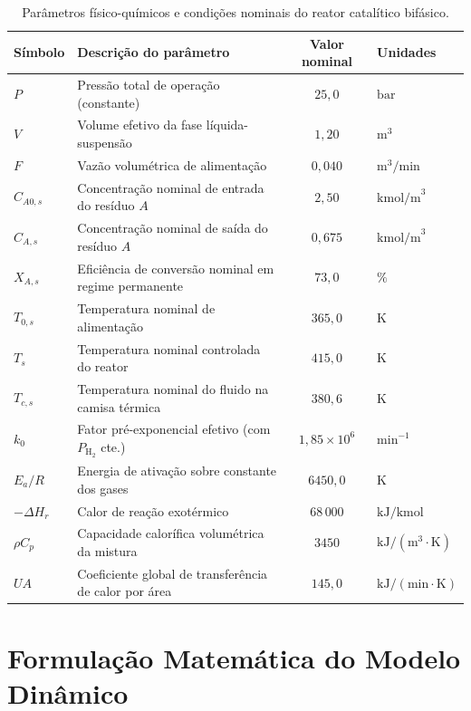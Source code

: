 \documentclass[11pt, a4paper]{article}
\begin{document}
\begin{table}[h]
\centering
\caption{Parâmetros físico-químicos e condições nominais do reator catalítico bifásico.}
\vspace{4pt}
\begin{tabular}{@{}llcl@{}}
\toprule
\textbf{Símbolo} & \textbf{Descrição do parâmetro} & \textbf{Valor nominal} & \textbf{Unidades} \\
\midrule
$P$ & Pressão total de operação (constante) & $25{,}0$ & $\text{bar}$ \\
$V$ & Volume efetivo da fase líquida-suspensão & $1{,}20$ & $\text{m}^3$ \\
$F$ & Vazão volumétrica de alimentação & $0{,}040$ & $\text{m}^3/\text{min}$ \\
$C_{A0,s}$ & Concentração nominal de entrada do resíduo $A$ & $2{,}50$ & $\text{kmol/m}^3$ \\
$C_{A,s}$ & Concentração nominal de saída do resíduo $A$ & $0{,}675$ & $\text{kmol/m}^3$ \\
$X_{A,s}$ & Eficiência de conversão nominal em regime permanente & $73{,}0$ & $\%$ \\
$T_{0,s}$ & Temperatura nominal de alimentação & $365{,}0$ & $\text{K}$ \\
$T_s$ & Temperatura nominal controlada do reator & $415{,}0$ & $\text{K}$ \\
$T_{c,s}$ & Temperatura nominal do fluido na camisa térmica & $380{,}6$ & $\text{K}$ \\
$k_0$ & Fator pré-exponencial efetivo (com $P_{\text{H}_2}$ cte.) & $1{,}85 \times 10^6$ & $\text{min}^{-1}$ \\
$E_a / R$ & Energia de ativação sobre constante dos gases & $6450{,}0$ & $\text{K}$ \\
$-\Delta H_r$ & Calor de reação exotérmico & $68\,000$ & $\text{kJ/kmol}$ \\
$\rho C_p$ & Capacidade calorífica volumétrica da mistura & $3450$ & $\text{kJ}/(\text{m}^3\cdot\text{K})$ \\
$UA$ & Coeficiente global de transferência de calor por área & $145{,}0$ & $\text{kJ}/(\text{min}\cdot\text{K})$ \\
\bottomrule
\end{tabular}
\end{table}

\section{Formulação Matemática do Modelo Dinâmico}
\end{document}
